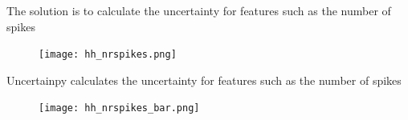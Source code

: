 \documentclass[presentation]{beamer}
\begin{document}
\begin{frame}{The solution is to calculate the uncertainty for features such as the number of spikes}
\vspace{-5mm}
\begin{figure}
   \texttt{[image: hh\_nrspikes.png]}
\end{figure}
\end{frame}

\begin{frame}{Uncertainpy calculates the uncertainty for features such as the number of spikes}
\vspace{-5mm}
\begin{figure}
   \texttt{[image: hh\_nrspikes\_bar.png]}
\end{figure}
\end{frame}


\end{document}
